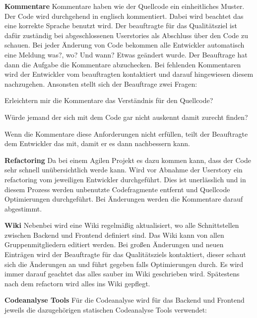 \documentclass[accentcolor=tud0b,12pt,paper=a4]{tudreport}
\begin{document}
\textbf{Kommentare}
Kommentare haben wie der Quellcode ein einheitliches Muster. Der Code wird durchgehend in englisch kommentiert. Dabei wird beachtet das eine korrekte Sprache benutzt wird. Der beauftragte für das Qualitätsziel ist dafür zuständig bei abgeschlossenen Userstories als Abschluss über den Code zu schauen. Bei jeder Änderung von Code bekommen alle Entwickler automatisch eine Meldung was?, wo? Und wann? Etwas geändert wurde. Der Beauftrage hat dann die Aufgabe die Kommentare abzuchecken. Bei fehlenden Kommentaren wird der Entwickler vom beauftragten kontaktiert und darauf hingewiesen diesem nachzugehen. Ansonsten stellt sich der Beauftrage zwei Fragen:
\begin{description}
\item Erleichtern mir die Kommentare das Verständnis für den Quellcode?
\item Würde jemand der sich mit dem Code gar nicht auskennt damit zurecht finden?
\end{description}
Wenn die Kommentare diese Anforderungen nicht erfüllen, teilt der Beauftragte dem Entwickler das mit, damit er es dann nachbessern kann.




\textbf{Refactoring}
Da bei einem Agilen Projekt es dazu kommen kann, dass der Code sehr schnell unübersichtlich werde kann. Wird vor Abnahme der Userstory ein refactoring vom jeweiligen Entwickler durchgeführt. Dies ist unerlässlich und in diesem Prozess werden unbenutzte Codefragmente entfernt und Quellcode Optimierungen durchgeführt. Bei Änderungen werden die Kommentare darauf abgestimmt.


\textbf{Wiki}
Nebenbei wird eine Wiki regelmäßig aktualisiert, wo alle Schnittstellen zwischen Backend und Frontend definiert sind. Das Wiki kann von allen Gruppenmitgliedern editiert werden. Bei großen Änderungen und neuen Einträgen wird der Beauftragte für das Qualitätsziels kontaktiert, dieser schaut sich die Änderungen an und führt gegeben falls Optimierungen durch. Es wird immer darauf geachtet das alles sauber im Wiki geschrieben wird. Spätestens nach dem refactorn wird alles ins Wiki gepflegt.

\textbf{Codeanalyse Tools}
Für die Codeanalyse wird für das Backend und Frontend jeweils die dazugehörigen statischen Codeanalyse Tools verwendet:
\end{document}
